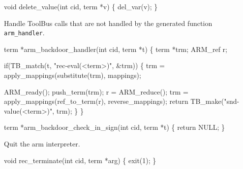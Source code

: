 

\nwenddocs{}\endmoddef\let\nwnotused=\nwoutput{}
void delete_value(int cid, term *v)
\{
  del_var(v);
\}
\nwendcode{}\nwdocspar



Handle ToolBus calls that are not handled by the generated
function {\tt arm\_handler}.

\nwenddocs{}\endmoddef\let\nwnotused=\nwoutput{}
term *arm_backdoor_handler(int cid, term *t)
\{
  term *trm;
  ARM_ref r;

  if(TB_match(t, "rec-eval(<term>)", &trm)) \{
    trm = apply_mappings(substitute(trm), mappings);

    ARM_ready();
    push_term(trm);
    r = ARM_reduce();
    trm = apply_mappings(ref_to_term(r), reverse_mappings);
    return TB_make("snd-value(<term>)", trm);
  \}
\}
\nwendcode{}\nwdocspar


\nwenddocs{}\endmoddef\let\nwnotused=\nwoutput{}
term *arm_backdoor_check_in_sign(int cid, term *t)
\{
  return NULL;
\}
\nwendcode{}\nwdocspar



Quit the arm interpreter.

\nwenddocs{}\endmoddef\let\nwnotused=\nwoutput{}
void rec_terminate(int cid, term *arg)
\{
  exit(1);
\}
\nwendcode{}\nwdocspar

